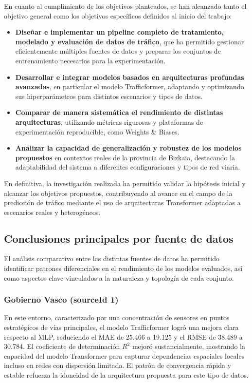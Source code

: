 En cuanto al cumplimiento de los objetivos planteados, se han alcanzado tanto el objetivo general como los objetivos específicos definidos al inicio del trabajo:
\begin{itemize}
	\item \textbf{Diseñar e implementar un pipeline completo de tratamiento, modelado y evaluación de datos de tráfico}, que ha permitido gestionar eficientemente múltiples fuentes de datos y preparar los conjuntos de entrenamiento necesarios para la experimentación.
	\item \textbf{Desarrollar e integrar modelos basados en arquitecturas profundas avanzadas}, en particular el modelo Trafficformer, adaptando y optimizando sus hiperparámetros para distintos escenarios y tipos de datos.
	\item \textbf{Comparar de manera sistemática el rendimiento de distintas arquitecturas}, utilizando métricas rigurosas y plataformas de experimentación reproducible, como Weights \& Biases.
	\item \textbf{Analizar la capacidad de generalización y robustez de los modelos propuestos} en contextos reales de la provincia de Bizkaia, destacando la adaptabilidad del sistema a diferentes configuraciones y tipos de red viaria.
\end{itemize}

En definitiva, la investigación realizada ha permitido validar la hipótesis inicial y alcanzar los objetivos propuestos, contribuyendo al avance en el campo de la predicción de tráfico mediante el uso de arquitecturas Transformer adaptadas a escenarios reales y heterogéneos.

\subsection{Conclusiones principales por fuente de datos}
\label{sec:concl_fue_dat}

El análisis comparativo entre las distintas fuentes de datos ha permitido identificar patrones diferenciales en el rendimiento de los modelos evaluados, así como aspectos clave vinculados a la naturaleza y topología de cada conjunto.

\subsubsection*{Gobierno Vasco (sourceId 1)}  
En este entorno, caracterizado por una concentración de sensores en puntos estratégicos de vías principales, el modelo Trafficformer logró una mejora clara respecto al MLP, reduciendo el MAE de 25.466 a 19.125 y el RMSE de 38.489 a 30.784. El coeficiente de determinación $R^2$ mejoró sustancialmente, mostrando la capacidad del modelo Transformer para capturar dependencias espaciales locales incluso en redes con dispersión limitada. El patrón de convergencia rápida y estable refuerza la idoneidad de la arquitectura propuesta para este tipo de datos.

